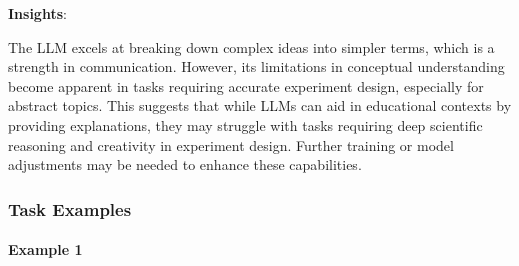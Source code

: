 \documentclass[fleqn,10pt]{wlscirep}
\begin{document}
\textbf{Insights}:

The LLM excels at breaking down complex ideas into simpler terms, which
is a strength in communication. However, its limitations in conceptual
understanding become apparent in tasks requiring accurate experiment
design, especially for abstract topics. This suggests that while LLMs
can aid in educational contexts by providing explanations, they may
struggle with tasks requiring deep scientific reasoning and creativity
in experiment design. Further training or model adjustments may be
needed to enhance these capabilities.

\hypertarget{task-examples-1}{%
\subsubsection{Task Examples}\label{task-examples-1}}

\hypertarget{example-1-1}{%
\paragraph{Example 1}\label{example-1-1}}
\end{document}
